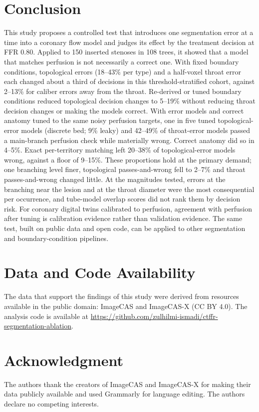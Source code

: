 \documentclass[journal,twoside,web]{ieeecolor}
\begin{document}
\section{Conclusion}
This study proposes a controlled test that introduces one segmentation error at a time into a coronary flow model and judges
its effect by the treatment decision at FFR 0.80. Applied to 150 inserted stenoses in 108 trees, it showed that a model that matches
perfusion is not necessarily a correct one. With fixed boundary conditions, topological errors (18--43\% per type) and a half-voxel throat error each changed about a third of decisions in this threshold-stratified cohort, against 2--13\% for caliber errors away from the throat. Re-derived or tuned boundary conditions reduced topological decision changes to 5--19\% without reducing throat decision changes or making the models correct. With error models and correct anatomy tuned to the same noisy perfusion targets, one in five tuned topological-error models (discrete bed; 9\% leaky) and 42--49\% of throat-error models passed a main-branch perfusion check while materially wrong. Correct anatomy did so in 4--5\%. Exact per-territory matching left 20--38\% of topological-error models wrong, against a floor of 9--15\%. These proportions hold at the primary demand; one branching level finer, topological passes-and-wrong fell to 2--7\% and throat passes-and-wrong changed little. At the magnitudes tested, errors at the branching near the lesion and at the throat diameter were the most consequential per occurrence, and tube-model overlap scores did not rank them by decision risk.
For coronary digital twins calibrated to perfusion, agreement with perfusion after tuning is calibration evidence
rather than validation evidence. The same test, built on public data and open code, can be applied to other segmentation and
boundary-condition pipelines.

\section*{Data and Code Availability}
The data that support the findings of this study were derived from resources available in the public domain: ImageCAS \cite{zeng2023} and ImageCAS-X \cite{imagecasx_data} (CC BY 4.0). The analysis code is available at \url{https://github.com/zulhilmi-ismadi/ctffr-segmentation-ablation}.

\section*{Acknowledgment}
The authors thank the creators of ImageCAS and ImageCAS-X for making their data publicly available and used Grammarly for language editing. The authors declare no competing interests.



\end{document}
